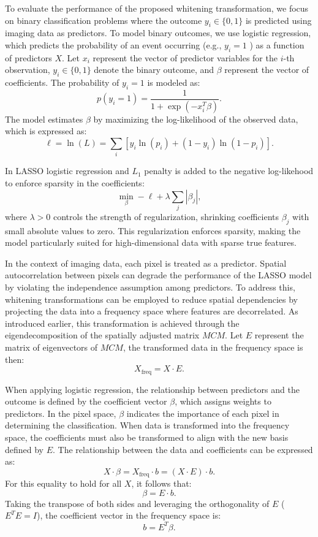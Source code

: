 \documentclass[12pt]{article}
\begin{document}
To evaluate the performance of the proposed whitening transformation, we focus on binary classification problems where the outcome \( y_i \in \{0, 1\} \) is predicted using imaging data as predictors. To model binary outcomes, we use logistic regression, which predicts the probability of an event occurring (e.g., \( y_i = 1 \) ) as a function of predictors \( X \). Let \( x_i \) represent the vector of predictor variables for the \( i \)-th observation, \( y_i \in \{ 0, 1 \} \) denote the binary outcome, and \( \beta \) represent the vector of coefficients. The probability of \( y_i = 1 \) is modeled as:
\[
  p(y_i = 1) = \frac{1}{1 + \exp(-x_i^T \beta)}.
\]
The model estimates \( \beta \) by maximizing the log-likelihood of the observed data, which is expressed as:
\[
  \ell = \ln(L) = \sum_i \left[ y_i \ln(p_i) + (1 - y_i) \ln(1 - p_i) \right].
\]

In LASSO logistic regression and \( L_1 \) penalty is added to the negative log-likehood to enforce sparsity in the coefficients:
\[
  \min_{\beta} - \ell + \lambda \sum_j |\beta_j|,
\]
where \( \lambda > 0 \) controls the strength of regularization, shrinking coefficients \( \beta_j \) with small absolute values to zero. This regularization enforces sparsity, making the model particularly suited for high-dimensional data with sparse true features.

In the context of imaging data, each pixel is treated as a predictor. Spatial autocorrelation between pixels can degrade the performance of the LASSO model by violating the independence assumption among predictors. To address this, whitening transformations can be employed to reduce spatial dependencies by projecting the data into a frequency space where features are decorrelated. As introduced earlier, this transformation is achieved through the eigendecomposition of the spatially adjusted matrix \( MCM \). Let \( E \) represent the matrix of eigenvectors of \( MCM \), the transformed data in the frequency space is then:
\[
  X_{\text{freq}} = X \cdot E.
\]

When applying logistic regression, the relationship between predictors and the outcome is defined by the coefficient vector \( \beta \), which assigns weights to predictors. In the pixel space, \( \beta \) indicates the importance of each pixel in determining the classification. When data is transformed into the frequency space, the coefficients must also be transformed to align with the new basis defined by \( E \). The relationship between the data and coefficients can be expressed as:
\[
  X \cdot \beta = X_{\text{freq}} \cdot b = (X \cdot E) \cdot b.
\]
For this equality to hold for all \( X \), it follows that:
\[
  \beta = E \cdot b.
\]
Taking the transpose of both sides and leveraging the orthogonality of \( E \) (\( E^T E = I \)), the coefficient vector in the frequency space is:
\[
  b = E^T \beta.
\]
\end{document}
